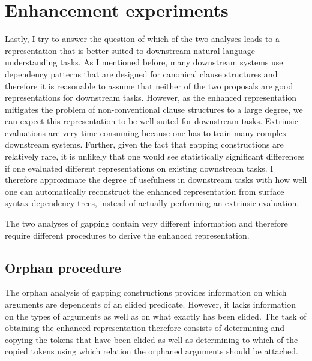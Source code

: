 \documentclass[lucida,biblatex]{sp} %
\begin{document}
\section{Enhancement experiments}
\label{sec:enhancements}

Lastly, I try to answer the question of which of the two analyses leads to a representation that is better suited to downstream natural language understanding tasks. As I mentioned before, many downstream systems use dependency patterns that are designed for canonical clause structures and therefore it is reasonable to assume that neither of the two proposals are good representations for downstream tasks. However, as the enhanced representation mitigates the problem of non-conventional clause structures to a large degree, we can expect this representation to be well suited for downstream tasks. Extrinsic evaluations are very time-consuming because one has to train many complex downstream systems. Further, given the fact that gapping constructions are relatively rare, it is unlikely that one would see statistically significant differences if one evaluated different representations on existing downstream tasks. I therefore approximate the degree of usefulness in downstream tasks with how well one can automatically reconstruct the enhanced representation from surface syntax dependency trees, instead of actually performing an extrinsic evaluation.

The two analyses of gapping contain very different information and therefore require different procedures to derive the enhanced representation. 
\subsection{Orphan procedure}

The {\sc orphan} analysis of gapping constructions provides information on which arguments are dependents of an elided predicate. However, it lacks information on the types of arguments as well as on what exactly has been elided. The task of obtaining the enhanced representation therefore consists  of determining and copying the tokens that have been elided as well as determining to which of the copied tokens using which relation the orphaned arguments should be attached.  
\end{document}
